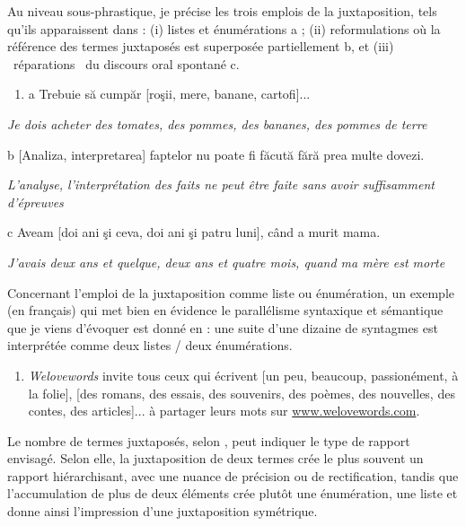 Au niveau sous-phrastique, je précise les trois emplois de la juxtaposition, tels qu'ils apparaissent dans \citet{Mouret2007} : (i) listes et énumérations a ; (ii) reformulations où la référence des termes juxtaposés est superposée partiellement b, et (iii) {\guillemotleft}~réparations~{\guillemotright} du discours oral spontané c. 


\begin{enumerate}
\item \label{bkm:Ref273639363}a  Trebuie să cumpăr [roşii, mere, banane, cartofi]...


\end{enumerate}
{\itshape
Je dois acheter des tomates, des pommes, des bananes, des pommes de terre } 

  b  [Analiza, interpretarea] faptelor nu poate fi făcută fără prea multe dovezi.

{\itshape
L'analyse, l'interprétation des faits ne peut être faite sans avoir suffisamment d'épreuves } 

  c  Aveam [doi ani şi ceva, doi ani şi patru luni], când a murit mama.

    \textit{J'avais deux ans et quelque, deux ans et quatre mois, quand ma mère est morte}

Concernant l'emploi de la juxtaposition comme liste ou énumération, un exemple (en français) qui met bien en évidence le parallélisme syntaxique et sémantique que je viens d'évoquer est donné en  : une suite d'une dizaine de syntagmes est interprétée comme deux listes / deux énumérations.


\begin{enumerate}
\item \label{bkm:Ref273691528}\textit{Welovewords} invite tous ceux qui écrivent [un peu, beaucoup, passionément, à la folie], [des romans, des essais, des souvenirs, des poèmes, des nouvelles, des contes, des articles]... à partager leurs mots sur \href{http://www.welovewords.com/}{{www.welovewords.com}}.


\end{enumerate}
Le nombre de termes juxtaposés, selon \citet{Noailly1986}, peut indiquer le type de rapport envisagé. Selon elle, la juxtaposition de deux termes crée le plus souvent un rapport hiérarchisant, avec une nuance de précision ou de rectification, tandis que l'accumulation de plus de deux éléments crée plutôt une énumération, une liste et donne ainsi l'impression d'une juxtaposition symétrique.

